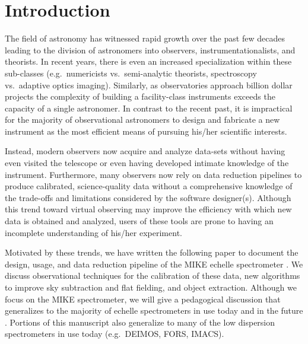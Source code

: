 \documentclass[12pt,preprint]{aastex}
\begin{document}
\section{Introduction}

The field of astronomy has witnessed rapid growth over
the past few decades leading to the division of astronomers 
into observers, instrumentationalists, and theorists.  
In recent years, there is even an increased specialization 
within these sub-classes (e.g.\ numericists vs.\ semi-analytic theorists,
spectroscopy vs.\ adaptive optics imaging).
Similarly, as observatories approach billion dollar projects
the complexity of building a facility-class instruments 
exceeds the capacity of a single astronomer.
In contrast to the recent past, 
it is impractical for the majority of
observational astronomers to design and fabricate a new instrument
as the most efficient means of pursuing his/her scientific interests.  

Instead, modern observers now acquire and analyze
data-sets without having even visited the telescope or even having
developed intimate knowledge of the instrument.
Furthermore,  many observers now rely on data reduction pipelines
to produce calibrated, science-quality data without a comprehensive
knowledge of the trade-offs and limitations considered by the
software designer(s).  Although this trend toward virtual observing
may improve the efficiency with which new data is obtained
and analyzed, 
users of these tools are prone to having an incomplete
understanding of his/her experiment.

Motivated by these trends, we have written the following
paper to document the design, usage, and data reduction pipeline
of the MIKE echelle spectrometer \citep{mike}.  
We discuss observational techniques for the calibration
of these data, new algorithms to improve sky subtraction and
flat fielding, and object extraction.
Although we focus on the MIKE spectrometer, we will give 
a pedagogical discussion that generalizes to the majority of 
echelle spectrometers in use today and in the future
\citep[e.g.\ HIRES, UVES;][]{vogt94,uves}.
Portions of this manuscript also generalize to many of the low
dispersion spectrometers in use today (e.g.\ DEIMOS, FORS, IMACS).
\end{document}
